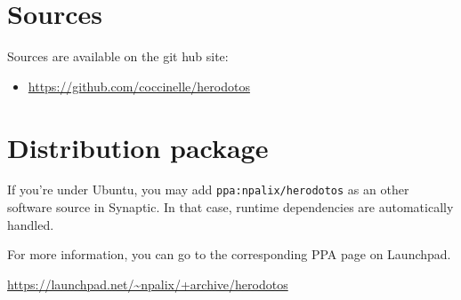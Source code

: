 \section{Sources}
\label{sec:sources}

Sources are available on the git hub site:
\begin{itemize}
\item \url{https://github.com/coccinelle/herodotos}
\end{itemize}

\section{Distribution package}
\label{sec:distro-package}

If you're under Ubuntu, you may add \texttt{ppa:npalix/herodotos} as
an other software source in Synaptic. In that case, runtime
dependencies are automatically handled.

\noindent For more information, you can go to the corresponding PPA page on Launchpad.

\url{https://launchpad.net/~npalix/+archive/herodotos}


